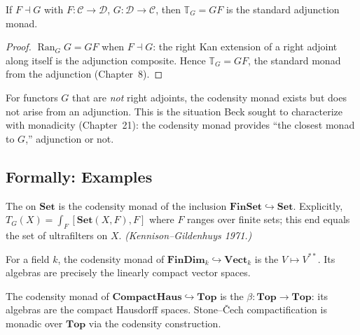 \begin{theorem}
\label{thm:adjoint-codensity}
If $F \dashv G$ with $F : \mathcal{C} \to \mathcal{D}$, $G : \mathcal{D} \to
\mathcal{C}$, then $\mathbb{T}_G = G F$ is the standard adjunction monad.
\end{theorem}

\begin{proof}
$\operatorname{Ran}_G G = G F$ when $F \dashv G$: the right Kan extension of
a right adjoint along itself is the adjunction composite. Hence
$\mathbb{T}_G = G F$, the standard monad from the adjunction (Chapter~8).
\end{proof}

\begin{remark}
For functors $G$ that are \emph{not} right adjoints, the codensity monad
exists but does not arise from an adjunction. This is the situation Beck
sought to characterize with monadicity (Chapter~21): the codensity monad
provides ``the closest monad to $G$,'' adjunction or not.
\end{remark}

\subsection{Formally: Examples}

\begin{example_thm}
The  on $\mathbf{Set}$ is the codensity monad of
the inclusion $\mathbf{FinSet} \hookrightarrow \mathbf{Set}$. Explicitly,
$T_G(X) = \int_F [\mathbf{Set}(X, F), F]$ where $F$ ranges over finite sets;
this end equals the set of ultrafilters on $X$. \emph{(Kennison--Gildenhuys
1971.)}
\end{example_thm}

\begin{example_thm}
For a field $k$, the codensity monad of $\mathbf{FinDim}_k \hookrightarrow
\mathbf{Vect}_k$ is the  $V \mapsto V^{**}$.
Its algebras are precisely the linearly compact vector spaces.
\end{example_thm}

\begin{example_thm}
The codensity monad of $\mathbf{CompactHaus} \hookrightarrow \mathbf{Top}$
is the  $\beta : \mathbf{Top} \to \mathbf{Top}$:
its algebras are the compact Hausdorff spaces. Stone--\v Cech compactification
is monadic over $\mathbf{Top}$ via the codensity construction.
\end{example_thm}


